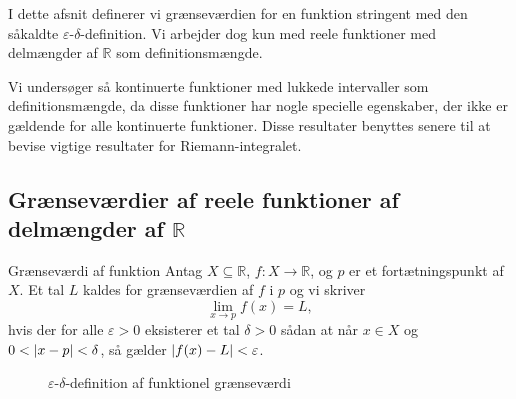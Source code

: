 I dette afsnit definerer vi grænseværdien for en funktion stringent med den såkaldte $\varepsilon $-$\delta $-definition.
Vi arbejder dog kun med reele funktioner med delmængder af $\mathbb{R}$ som definitionsmængde. 

Vi undersøger så kontinuerte funktioner med lukkede intervaller som definitionsmængde, da disse funktioner har nogle specielle egenskaber, der ikke er gældende for alle kontinuerte funktioner.
Disse resultater benyttes senere til at bevise vigtige resultater for Riemann-integralet.

\subsection{Grænseværdier af reele funktioner af delmængder af $\mathbb{R}$}%
\label{sub:Grænseværdi}
\begin{definition}[label=def:grænseværdi]{Grænseværdi af funktion}{}
  Antag $X \subseteq \mathbb{R}$, $f:X \to \mathbb{R}$, og $p$ er et fortætningspunkt af $X$.
  Et tal $L$ kaldes for grænseværdien af $f$ i $p$ og vi skriver
  \[
  \lim_{x \to p} f(x)= L,
  \] 
  hvis der for alle $\varepsilon >0$ eksisterer et tal $\delta >0$ sådan at når $x \in X$ og $0<\abs{x-p} < \delta  $, så gælder $\abs{f(x)-L} <\varepsilon $.  
\end{definition}

\begin{figure}[H]
\begin{center}
\end{center}
\caption{$\varepsilon $-$\delta $-definition af funktionel grænseværdi}%
\label{fig:epsilondelta}
\end{figure}


